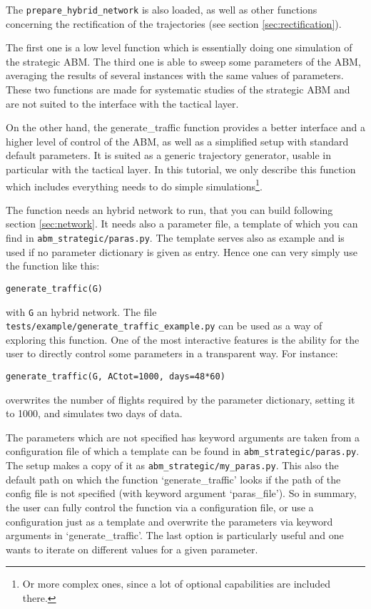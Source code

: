 \documentclass[12pt]{article}
\begin{document}
The \verb|prepare_hybrid_network| is also loaded, as well as other functions concerning the rectification of the trajectories (see section \ref{sec:rectification}).

The first one is a low level function which is essentially doing one simulation of the strategic ABM. The third one is able to sweep some parameters of the ABM, averaging the results of several instances with the same values of parameters. These two functions are made for systematic studies of the strategic ABM and are not suited to the interface with the tactical layer.

On the other hand, the generate\_traffic function provides a better interface and a higher level of control of the ABM, as well as a simplified setup with standard default parameters. It is suited as a generic trajectory generator, usable in particular with the tactical layer. In this tutorial, we only describe this function which includes everything needs to do simple simulations\footnote{Or more complex ones, since a lot of optional capabilities are included there.}.

The function needs an hybrid network to run, that you can build following section \ref{sec:network}. It needs also a parameter file, a template of which you can find in \verb|abm_strategic/paras.py|. The template serves also as example and is used if no parameter dictionary is given as entry. Hence one can very simply use the function like this:
\begin{verbatim}
generate_traffic(G)
\end{verbatim}
with \verb|G| an hybrid network. The file \verb|tests/example/generate_traffic_example.py| can be used as a way of exploring this function. One of the most interactive features is the ability for the user to directly control some parameters in a transparent way. For instance:
\begin{verbatim}
generate_traffic(G, ACtot=1000, days=48*60)
\end{verbatim}
overwrites the number of flights required by the parameter dictionary, setting it to 1000, and simulates two days of data.

The parameters which are not specified has keyword arguments are taken from a configuration file of which a template can be found in \verb|abm_strategic/paras.py|. The setup makes a copy of it as \verb|abm_strategic/my_paras.py|. This also the default path on which the function `generate\_traffic' looks if the path of the config file is not specified (with keyword argument `paras\_file'). So in summary, the user can fully control the function via a configuration file, or use a configuration just as a template and overwrite the parameters via keyword arguments in `generate\_traffic'. The last option is particularly useful and one wants to iterate on different values for a given parameter.
\end{document}
